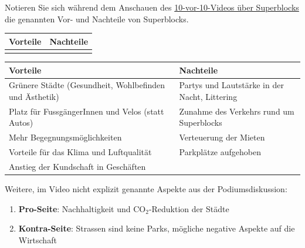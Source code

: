 \begin{myexercise}
Notieren Sie sich während dem Anschauen des \href{https://www.srf.ch/play/tv/10-vor-10/video/superblocks---stadtstrassen-begruenen-statt-befahren?urn=urn:srf:video:2edec553-2a82-435c-92a5-824bd5312f04}{10-vor-10-Videos über Superblocks} die genannten Vor- und Nachteile von Superblocks.

\begin{table}[H]
\centering
\begin{tabular}{p{}|p{}}
\textbf{Vorteile} & \textbf{Nachteile} \\\midrule\midrule
&\\[300 pt]
\end{tabular}
\end{table}
\begin{myanswer}
\begin{table}[H]
\centering
\begin{tabular}{p{}|p{}}
\textbf{Vorteile} & \textbf{Nachteile} \\\midrule\midrule
Grünere Städte (Gesundheit, Wohlbefinden und Ästhetik) & Partys und Lautstärke in der Nacht, Littering\\\midrule
Platz für FussgängerInnen und Velos (statt Autos)& Zunahme des Verkehrs rund um Superblocks\\\midrule
Mehr Begegnungsmöglichkeiten&Verteuerung der Mieten\\\midrule
Vorteile für das Klima und Luftqualität & Parkplätze aufgehoben\\\midrule
Anstieg der Kundschaft in Geschäften &\\
\end{tabular}
\end{table}

Weitere, im Video nicht explizit genannte Aspekte aus der Podiumsdiskussion: 
\begin{enumerate}
\item \textbf{Pro-Seite}: Nachhaltigkeit und CO$_2$-Reduktion der Städte
\item \textbf{Kontra-Seite}: Strassen sind keine Parks, mögliche negative Aspekte auf die Wirtschaft
\end{enumerate}
\end{myanswer}
\end{myexercise}
\newpage

